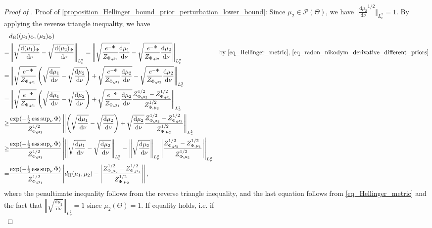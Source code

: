 \documentclass[a4paper]{scrartcl}
\theoremstyle{definition}
\numberwithin{equation}{section}
\newcommand{\rd}{\mathrm{d}}
\DeclareMathOperator*{\esssup}{ess\,sup}
\newcommand{\Abs}[1]{\left\vert#1\right\vert}
\newcommand{\norm}[1]{\Vert #1 \Vert}
\newcommand{\Norm}[1]{\left\Vert #1 \right\Vert}
\newcommand{\Hel}[0]{\textup{H}}
\begin{document}
\begin{proof}[Proof of ]
   Proof of \cref{proposition_Hellinger_bound_prior_perturbation_lower_bound}: 
   Since $\mu_2\in\mathcal{P}(\Theta)$, we have $\norm{ \tfrac{\rd\mu_2}{\rd\nu}^{1/2}}_{L^2_\nu}=1$.
   By applying the reverse triangle inequality, we have
 \begin{align*}
    &d_{\Hel}((\mu_1)_\Phi,(\mu_2)_\Phi)
     \nonumber
     \\
  =& \Norm{\sqrt{\frac{\rd(\mu_1)_\Phi}{\rd\nu}}-\sqrt{\frac{\rd(\mu_2)_\Phi}{\rd\nu}}}_{L^2_\nu}= \Norm{\sqrt{\frac{e^{-\Phi}}{Z_{\Phi,\mu_1}}\frac{\rd\mu_1}{\rd\nu}} -\sqrt{\frac{e^{-\Phi}}{Z_{\Phi,\mu_2}}\frac{\rd\mu_2}{\rd\nu}}}_{L^2_\nu} & \text{by \eqref{eq_Hellinger_metric}, \eqref{eq_radon_nikodym_derivative_different_priors}}
     \nonumber
     \\
   =&\Norm{\sqrt{\frac{e^{-\Phi}}{Z_{\Phi,\mu_1}}}\left(\sqrt{\frac{\rd\mu_1}{\rd\nu}}-\sqrt{\frac{\rd\mu_2}{\rd\nu}}\right)+\sqrt{\frac{e^{-\Phi}}{Z_{\Phi,\mu_1}}\frac{\rd\mu_2}{\rd\nu}} -\sqrt{\frac{e^{-\Phi}}{Z_{\Phi,\mu_2}}\frac{\rd\mu_2}{\rd\nu}}}_{L^2_\nu}
   \nonumber
  \\
   =&\Norm{\sqrt{\frac{e^{-\Phi}}{Z_{\Phi,\mu_1}}}\left(\sqrt{\frac{\rd\mu_1}{\rd\nu}}-\sqrt{\frac{\rd\mu_2}{\rd\nu}}\right)+\sqrt{\frac{e^{-\Phi}}{Z_{\Phi,\mu_1}}\frac{\rd\mu_2}{\rd\nu}} \frac{Z_{\Phi,\mu_2}^{1/2}-Z_{\Phi,\mu_1}^{1/2}}{Z_{\Phi,\mu_2}^{1/2} }}_{L^2_\nu} &
   \\
   \geq & \frac{\exp(-\tfrac{1}{2}\esssup_\nu\Phi)}{Z_{\Phi,\mu_1}^{1/2}}\Norm{\left(\sqrt{\frac{\rd\mu_1}{\rd\nu}}-\sqrt{\frac{\rd\mu_2}{\rd\nu}}\right)+\sqrt{\frac{\rd\mu_2}{\rd\nu}} \frac{Z_{\Phi,\mu_2}^{1/2}-Z_{\Phi,\mu_1}^{1/2}}{Z_{\Phi,\mu_2}^{1/2} }}_{L^2_\nu}
   \\
   \geq & \frac{\exp(-\tfrac{1}{2}\esssup_\nu\Phi)}{Z_{\Phi,\mu_1}^{1/2}}\Abs{\Norm{\sqrt{\frac{\rd\mu_1}{\rd\nu}}-\sqrt{\frac{\rd\mu_2}{\rd\nu}}}_{L^2_\nu}-\Norm{ \sqrt{\frac{\rd\mu_2}{\rd\nu}}}_{L^2_\nu}\Abs{\frac{Z_{\Phi,\mu_2}^{1/2}-Z_{\Phi,\mu_1}^{1/2}}{Z_{\Phi,\mu_2}^{1/2} }}}_{L^2_\nu}
   \\
   =&\frac{\exp(-\tfrac{1}{2}\esssup_\nu\Phi)}{Z_{\Phi,\mu_1}^{1/2}}\Abs{d_{\Hel}(\mu_1,\mu_2)-\Abs{\frac{Z_{\Phi,\mu_2}^{1/2}-Z_{\Phi,\mu_1}^{1/2}}{Z_{\Phi,\mu_2}^{1/2} }}},
 \end{align*}
 where the penultimate inequality follows from the reverse triangle inequality, and the last equation follows from \eqref{eq_Hellinger_metric} and the fact that $\Norm{ \sqrt{\frac{\rd\mu_2}{\rd\nu}}}_{L^2_\nu}=1$ since $\mu_2(\Theta)=1$.
 If equality holds, i.e. if 
 \begin{equation}

\end{equation}
\end{proof}
\end{document}
